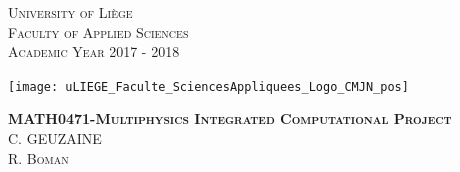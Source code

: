 \documentclass[12 pt]{report}
\begin{document}
\begin{titlepage}
    \vspace{-1cm}
    
    \begin{minipage}{0.6\textwidth}
        \begin{flushleft}
            \centering
            \textsc{University of Liège} \\
            \textsc{Faculty of Applied Sciences} \\
            \textsc{Academic Year 2017 - 2018}
        \end{flushleft}
    \end{minipage}

    \vspace{-2.6cm}
    \hspace{0.5\textwidth}
    
    \begin{minipage}[t]{\textwidth}
        \begin{flushright}
            \texttt{[image: uLIEGE\_Faculte\_SciencesAppliquees\_Logo\_CMJN\_pos]}
        \end{flushright}
    \end{minipage}

    \vspace{1cm}


    \begin{minipage}{\textwidth}
        \hspace{-0.7cm}\noindent\makebox[\linewidth]{\rule{\textwidth}{2pt}} 
    \end{minipage}

    \vspace{1cm}

    \begin{minipage}{\textwidth}
        \begin{center}
           \hspace{-0.8cm}\Huge{\textsc{\textbf{MATH0471-Multiphysics Integrated Computational Project}}}\\
            \vspace{0.3cm}
            \hspace{-0.8cm}\textsc{C. GEUZAINE \\ R. Boman} \\
        \end{center}
    \end{minipage}

    \vspace{1cm}

    \begin{minipage}{\textwidth}
        \hspace{-0.7cm}\noindent\makebox[\linewidth]{\rule{\textwidth}{0.2pt}}
    \end{minipage}


\end{titlepage}
\end{document}
